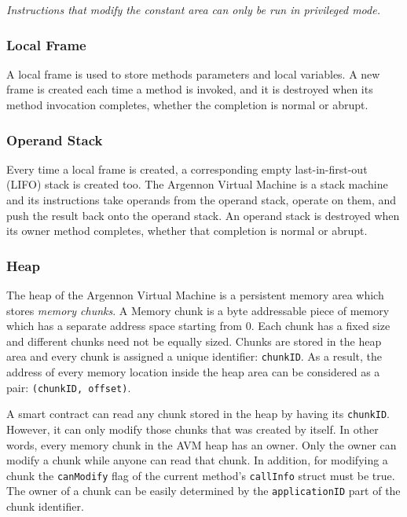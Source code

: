 \documentclass[11pt, a4paper]{report}
\newcommand{\note}[1] {
    \begin{tcolorbox}[colframe=white,colback=white]
        \emph{#1}
    \end{tcolorbox}
}
\begin{document}
    \note{Instructions that modify the constant area can only be run in privileged mode.}


    \subsubsection{Local Frame}

    A local frame is used to store methods parameters and local variables. A new frame is created each time a method
    is invoked, and it is destroyed when its method invocation completes, whether the completion is normal or abrupt.

    \subsubsection{Operand Stack}

    Every time a local frame is created, a corresponding empty last-in-first-out (LIFO) stack is created too. The
    Argennon Virtual Machine is a stack machine and its instructions take operands from the operand stack, operate on
    them, and push the result back onto the operand stack. An operand stack is destroyed when its owner method
    completes, whether that completion is normal or abrupt.

    \subsubsection{Heap}

    The heap of the Argennon Virtual Machine is a persistent memory area which stores \emph{memory chunks}. A Memory
    chunk is a byte addressable piece of memory which has a separate address space starting from 0. Each chunk has a
    fixed size and different chunks need not be equally sized. Chunks are stored in the heap area and every chunk is
    assigned a unique identifier: \texttt{chunkID}. As a result, the address of every memory location inside
    the heap area can be considered as a pair: \texttt{(chunkID, offset)}.

    A smart contract can read any chunk stored in the heap by having its \texttt{chunkID}. However, it can only modify
    those chunks that was created by itself. In other words, every memory chunk in the AVM heap has an owner. Only
    the owner can modify a chunk while anyone can read that chunk. In addition, for modifying a chunk the \texttt{canModify}
    flag of the current method's \texttt{callInfo} struct must be true. The owner of a chunk can be easily determined
    by the \texttt{applicationID} part of the chunk identifier.
\end{document}
